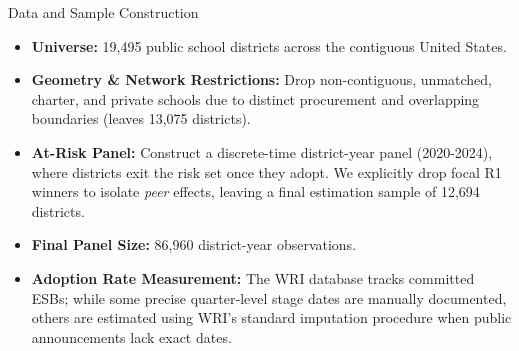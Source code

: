 \documentclass[aspectratio=169]{beamer}
\begin{document}

\begin{frame}{Data and Sample Construction}
    \begin{itemize}
        \item \textbf{Universe:} 19,495 public school districts across the contiguous United States.
        \item \textbf{Geometry \& Network Restrictions:} Drop non-contiguous, unmatched, charter, and private schools due to distinct procurement and overlapping boundaries (leaves 13,075 districts).
        \item \textbf{At-Risk Panel:} Construct a discrete-time district-year panel (2020-2024), where districts exit the risk set once they adopt. We explicitly drop focal R1 winners to isolate \textit{peer} effects, leaving a final estimation sample of 12,694 districts.
        \item \textbf{Final Panel Size:} 86,960 district-year observations.
        \item \textbf{Adoption Rate Measurement:} The WRI database tracks committed ESBs; while some precise quarter-level stage dates are manually documented, others are estimated using WRI's standard imputation procedure when public announcements lack exact dates.
    \end{itemize}
\end{frame}
\end{document}
